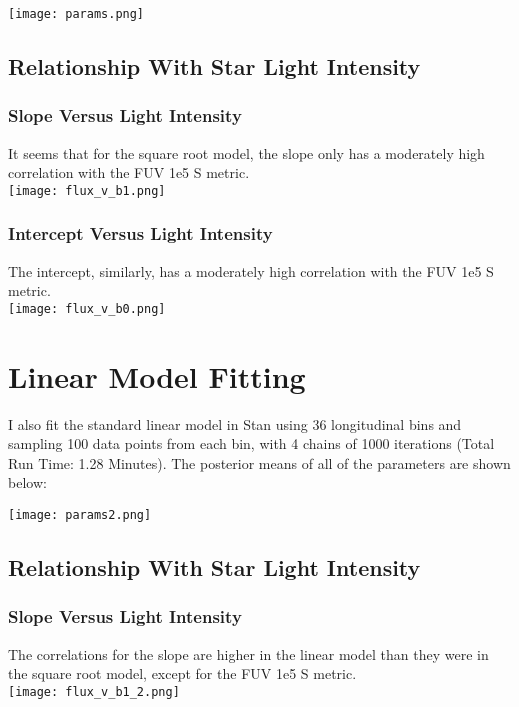 \documentclass[12pt]{article}
\begin{document}
\indent\indent \texttt{[image: params.png]}

\pagebreak
\subsection{Relationship With Star Light Intensity}

\subsubsection{Slope Versus Light Intensity}
It seems that for the square root model, the slope only has a moderately high correlation with the FUV 1e5 S metric.\\
\indent\indent \texttt{[image: flux\_v\_b1.png]}

\subsubsection{Intercept Versus Light Intensity}
The intercept, similarly, has a moderately high correlation with the FUV 1e5 S metric.\\
\indent\indent \texttt{[image: flux\_v\_b0.png]}

\pagebreak
\section{Linear Model Fitting}
I also fit the standard linear model in Stan using 36 longitudinal bins and sampling 100 data points from each bin, with 4 chains of 1000 iterations (Total Run Time: 1.28 Minutes).  The posterior means of all of the parameters are shown below:

\indent\indent \texttt{[image: params2.png]}

\pagebreak
\subsection{Relationship With Star Light Intensity}

\subsubsection{Slope Versus Light Intensity}
The correlations for the slope are higher in the linear model than they were in the square root model, except for the FUV 1e5 S metric.\\
\indent\indent \texttt{[image: flux\_v\_b1\_2.png]}
\end{document}
